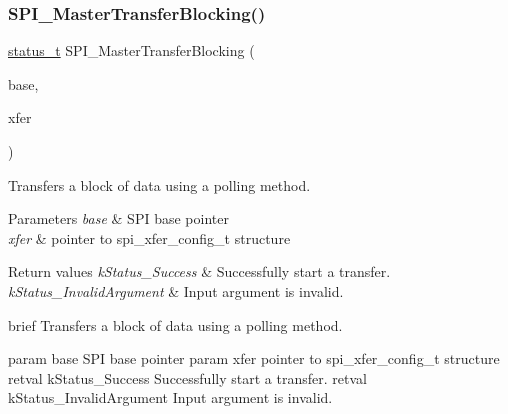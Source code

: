 \subsubsection{\texorpdfstring{SPI\_MasterTransferBlocking()}{SPI\_MasterTransferBlocking()}}
{\footnotesize\ttfamily \mbox{\hyperlink{group__ksdk__common_gaaabdaf7ee58ca7269bd4bf24efcde092}{status\+\_\+t}} S\+P\+I\+\_\+\+Master\+Transfer\+Blocking (\begin{DoxyParamCaption}\item[{\mbox{\hyperlink{struct_s_p_i___type}{S\+P\+I\+\_\+\+Type}} $\ast$}]{base,  }\item[{\mbox{\hyperlink{group__spi__driver_ga59314d5596f240cfbe8b9466bd99ed3f}{spi\+\_\+transfer\+\_\+t}} $\ast$}]{xfer }\end{DoxyParamCaption})}



Transfers a block of data using a polling method. 


\begin{DoxyParams}{Parameters}
{\em base} & S\+PI base pointer \\
\hline
{\em xfer} & pointer to spi\+\_\+xfer\+\_\+config\+\_\+t structure \\
\hline
\end{DoxyParams}

\begin{DoxyRetVals}{Return values}
{\em k\+Status\+\_\+\+Success} & Successfully start a transfer. \\
\hline
{\em k\+Status\+\_\+\+Invalid\+Argument} & Input argument is invalid.\\
\hline
\end{DoxyRetVals}
brief Transfers a block of data using a polling method.

param base S\+PI base pointer param xfer pointer to spi\+\_\+xfer\+\_\+config\+\_\+t structure retval k\+Status\+\_\+\+Success Successfully start a transfer. retval k\+Status\+\_\+\+Invalid\+Argument Input argument is invalid. \mbox{\label{group__spi__driver_ga6cf3e807307ecb22578cc9088adafcf2}} 
